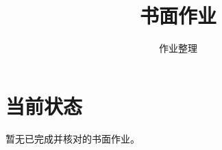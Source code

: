 \documentclass[11pt,a4paper,fontset=fandol]{ctexart}
\title{\textcolor{ntuRed}{\coursecode}\\[0.4em]\coursetitle\\[0.8em]\large 书面作业}
\author{作业整理}
\begin{document}
\maketitle

\section*{当前状态}
暂无已完成并核对的书面作业。
\end{document}
